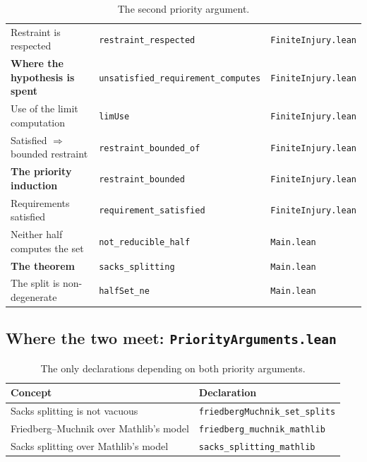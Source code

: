 \begin{table}[h]
\begin{tabular}{lll}
Restraint is respected & \texttt{restraint\_respected} & \texttt{FiniteInjury.lean} \\
\textbf{Where the hypothesis is spent} & \texttt{unsatisfied\_requirement\_computes} & \texttt{FiniteInjury.lean} \\
Use of the limit computation & \texttt{limUse} & \texttt{FiniteInjury.lean} \\
Satisfied $\Rightarrow$ bounded restraint & \texttt{restraint\_bounded\_of} & \texttt{FiniteInjury.lean} \\
\textbf{The priority induction} & \texttt{restraint\_bounded} & \texttt{FiniteInjury.lean} \\
Requirements satisfied & \texttt{requirement\_satisfied} & \texttt{FiniteInjury.lean} \\
Neither half computes the set & \texttt{not\_reducible\_half} & \texttt{Main.lean} \\
\textbf{The theorem} & \texttt{sacks\_splitting} & \texttt{Main.lean} \\
The split is non-degenerate & \texttt{halfSet\_ne} & \texttt{Main.lean} \\
\bottomrule
\end{tabular}
\caption{The second priority argument.}
\end{table}

\subsection{Where the two meet: \texttt{PriorityArguments.lean}}

\begin{table}[h]
\centering
\small
\begin{tabular}{ll}
\toprule
Concept & Declaration \\
\midrule
Sacks splitting is not vacuous & \texttt{friedbergMuchnik\_set\_splits} \\
Friedberg--Muchnik over Mathlib's model & \texttt{friedberg\_muchnik\_mathlib} \\
Sacks splitting over Mathlib's model & \texttt{sacks\_splitting\_mathlib} \\
\bottomrule
\end{tabular}
\caption{The only declarations depending on both priority arguments.}
\end{table}

